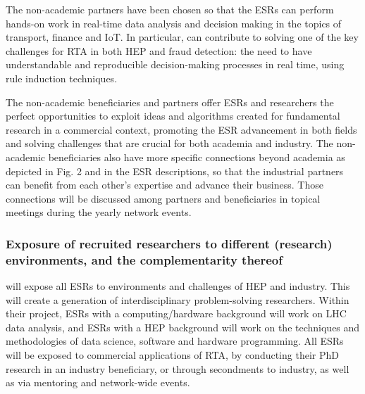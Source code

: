 The non-academic partners have been chosen so that the ESRs can perform hands-on work in real-time data analysis and decision making in the topics of transport, finance and IoT. 
In particular, \ibmentity can contribute to solving one of the key challenges for RTA in both HEP and fraud detection: the need to have understandable and reproducible decision-making processes in real time, using rule induction techniques. 

The non-academic beneficiaries and partners offer ESRs and researchers the perfect opportunities to exploit ideas and algorithms created for fundamental research in a commercial context, promoting the ESR  advancement in both fields and solving challenges that are crucial for both academia and industry. The non-academic beneficiaries also have more specific connections beyond academia as depicted in Fig. 2 and in the ESR descriptions, so that the industrial partners can benefit from each other's expertise and advance their business. Those connections will be discussed among partners and beneficiaries in topical meetings during the yearly network events. 


\vspace{-2mm}
\subsubsection{Exposure of recruited researchers to different (research) environments, and the complementarity thereof}
\label{sec:exposureComplementarity}

\acronym will expose all ESRs to environments and challenges of HEP and industry. This will create a generation of interdisciplinary problem-solving researchers.
Within their project, ESRs with a computing/hardware background will work on LHC data analysis, and ESRs with a HEP background will work on the techniques and methodologies of data science, software and hardware programming.
All ESRs will be exposed to commercial applications of RTA, by conducting their PhD research in an industry beneficiary, or through secondments to industry, as well as via mentoring and network-wide events. 

